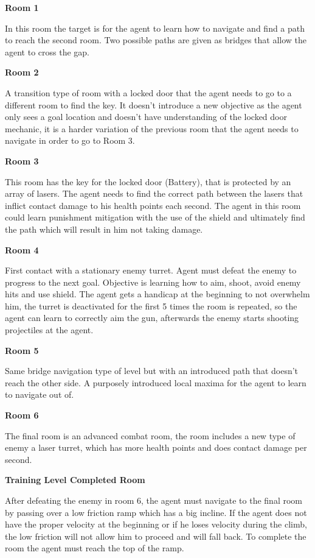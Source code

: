 \documentclass[a4paper,one side,12pt]{book}
\begin{document}
\textbf{Room 1}

In this room the target is for the agent to learn how to navigate and
find a path to reach the second room. Two possible paths are given as
bridges that allow the agent to cross the gap.

\textbf{Room 2}

A transition type of room with a locked door that the agent needs to go
to a different room to find the key. It doesn't introduce a new
objective as the agent only sees a goal location and doesn't have
understanding of the locked door mechanic, it is a harder variation of
the previous room that the agent needs to navigate in order to go to
Room 3.

\textbf{Room 3}

This room has the key for the locked door (Battery), that is protected
by an array of lasers. The agent needs to find the correct path between
the lasers that inflict contact damage to his health points each second.
The agent in this room could learn punishment mitigation with the use of
the shield and ultimately find the path which will result in him not
taking damage.

\textbf{Room 4}

First contact with a stationary enemy turret. Agent must defeat the
enemy to progress to the next goal. Objective is learning how to aim,
shoot, avoid enemy hits and use shield. The agent gets a handicap at the
beginning to not overwhelm him, the turret is deactivated for the first
5 times the room is repeated, so the agent can learn to correctly aim
the gun, afterwards the enemy starts shooting projectiles at the agent.

\textbf{Room 5}

Same bridge navigation type of level but with an introduced path that
doesn't reach the other side. A purposely introduced local maxima for
the agent to learn to navigate out of.

\textbf{Room 6}

The final room is an advanced combat room, the room includes a new type of enemy a laser turret, which has more health points and does contact
damage per second.

\textbf{Training Level Completed Room}

After defeating the enemy in room 6, the agent must navigate to the
final room by passing over a low friction ramp which has a big incline.
If the agent does not have the proper velocity at the beginning or if he
loses velocity during the climb, the low friction will not allow him to
proceed and will fall back. To complete the room the agent must reach
the top of the ramp.
\end{document}
